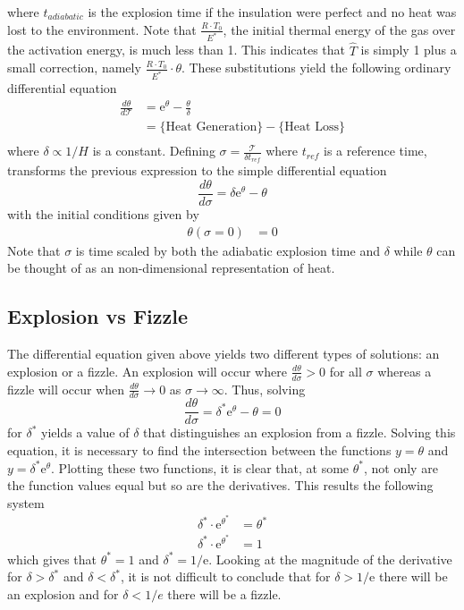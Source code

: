 \documentclass{article}
\begin{document}
where $t_{adiabatic}$ is the explosion time if the insulation were perfect and no heat was lost to the environment. Note that $\frac{R\cdot T_0}{E^*}$, the initial thermal energy of the gas over the activation energy, is much less than 1.  This indicates that $\hat{T}$ is simply 1 plus a small correction, namely $ \frac{R\cdot T_0}{E^*}\cdot \theta$. These substitutions yield the following ordinary differential equation
\begin{align*}
\frac{d\theta}{d\mathcal{T}} &= \text{e}^\theta - \frac{\theta}{\delta}\\
&= \big\{\text{Heat Generation}\big\} - \big\{\text{Heat Loss}\big\}\\
\end{align*}
where $\delta\propto1/H$ is a constant.  Defining $\sigma = \frac{\mathcal{T}}{\delta t_{ref}} $ where $t_{ref}$ is a reference time,  transforms the previous expression to the simple differential equation $$\frac{d\theta}{d\sigma} = \delta \text{e}^\theta-\theta$$ with the initial conditions given by 
\begin{align*}
    \theta(\sigma = 0) &= 0
\end{align*}
Note that $\sigma$ is time scaled by both the adiabatic explosion time and $\delta$ while $\theta$ can be thought of as an non-dimensional representation of heat. 
\subsection*{Explosion vs Fizzle}
The differential equation given above yields two different types of solutions: an explosion or a fizzle.  An explosion will occur where $\frac{d\theta}{d\sigma}>0$ for all $\sigma$ whereas a fizzle will occur when $\frac{d\theta}{d\sigma} \to 0$ as $\sigma \to \infty$.  Thus, solving $$\frac{d\theta}{d\sigma} = \delta^*\text{e}^{\theta} - \theta = 0$$ for $\delta^*$ yields a value of $\delta$ that distinguishes an explosion from a fizzle.  Solving this equation, it is necessary to find the intersection between the functions $y = \theta$ and $y = \delta^* \text{e}^{\theta}$.  Plotting these two functions, it is clear that, at some $\theta^*$, not only are the function values equal but so are the derivatives.  This results the following system 
\begin{align*}
    \delta^* \cdot \text{e}^{\theta^*} &= \theta^*\\
    \delta^* \cdot \text{e}^{\theta^*} &= 1
\end{align*}
which gives that $\theta^* = 1$ and $\delta^* = 1/\text{e}$.  Looking at the magnitude of the derivative for $\delta > \delta^*$ and $\delta < \delta^*$, it is not difficult to conclude that for $\delta > 1/\text{e}$ there will be an explosion and for $\delta<1/e$ there will be a fizzle.\\
\end{document}
